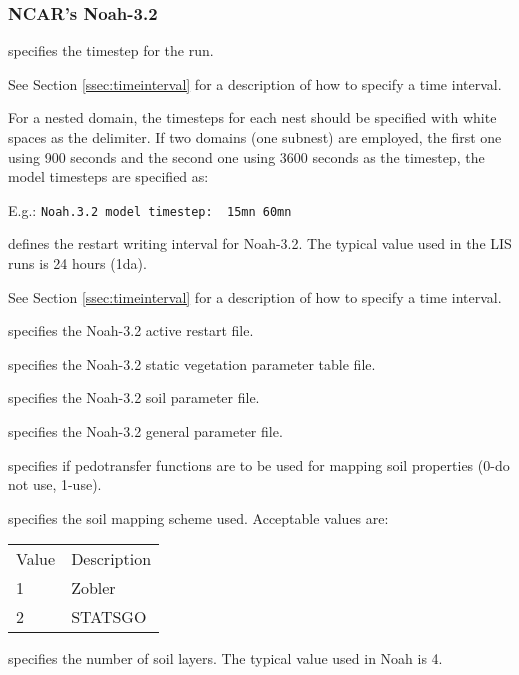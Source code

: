  
 \subsubsection{NCAR's Noah-3.2} \label{sssec:lsm_noah32}
 

 
  specifies the timestep for the run.

 See Section \ref{ssec:timeinterval} for a description
 of how to specify a time interval.

 For a nested domain, the timesteps for each nest should be specified
 with white spaces as the delimiter. If two domains (one subnest) are
 employed, the first one using 900 seconds and the second one using
 3600 seconds as the timestep, the model timesteps are specified as:

 E.g.: \quad \verb+Noah.3.2 model timestep:  15mn 60mn+

  defines the restart
 writing interval for Noah-3.2. The typical value used in the
 LIS runs is 24 hours (1da).

 See Section \ref{ssec:timeinterval} for a description
 of how to specify a time interval.

  specifies the Noah-3.2 active
 restart file.

  specifies the
 Noah-3.2 static vegetation parameter table file.

  specifies the
 Noah-3.2 soil parameter file.

  specifies the
 Noah-3.2 general parameter file.

  specifies if
 pedotransfer functions are to be used for mapping soil properties
 (0-do not use, 1-use).

  specifies the soil mapping scheme used.
 Acceptable values are:

 \begin{tabular}{ll}
 Value & Description \\
 1     & Zobler      \\
 2     & STATSGO     \\
 \end{tabular}

  specifies the number of
 soil layers. The typical value used in Noah is 4.

